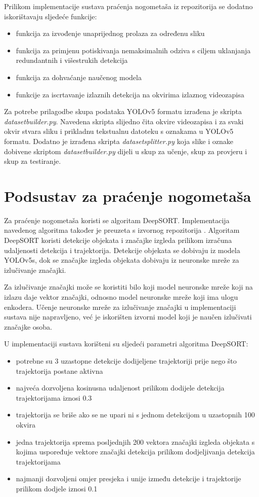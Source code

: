 \documentclass[times, utf8, seminar, numeric]{fer}
\begin{document}
Prilikom implementacije sustava praćenja nogometaša iz repozitorija se dodatno iskorištavaju sljedeće funkcije:
\begin{itemize}
	\item funkcija za izvođenje unaprijednog prolaza za određenu sliku
	\item funkcija za primjenu potiskivanja nemaksimalnih odziva s ciljem uklanjanja redundantnih i višestrukih detekcija
	\item funkcija za dohvaćanje naučenog modela
	\item funkcije za iscrtavanje izlaznih detekcija na okvirima izlaznog videozapisa 
\end{itemize}


Za potrebe prilagodbe skupa podataka YOLOv5 formatu izrađena je skripta \textit{dataset\textunderscore builder.py}. Navedena skripta slijedno čita okvire videozapisa i za svaki okvir stvara sliku i prikladnu tekstualnu datoteku s oznakama u YOLOv5 formatu. 
Dodatno je izrađena skripta \textit{dataset\textunderscore splitter.py} koja slike i oznake dobivene skriptom \textit{dataset\textunderscore builder.py} dijeli u skup za učenje, skup za provjeru i skup za testiranje.

\section{Podsustav za praćenje nogometaša}

Za praćenje nogometaša koristi se algoritam DeepSORT. 
Implementacija navedenog algoritma također je preuzeta s izvornog repozitorija \cite{Wojke2018deep}\cite{deepsort}. 
Algoritam DeepSORT koristi detekcije objekata i značajke izgleda prilikom izračuna udaljenosti detekcija i trajektorija. Detekcije objekata se dobivaju iz modela YOLOv5s, dok se značajke izgleda objekata dobivaju iz neuronske mreže za izlučivanje značajki.

Za izlučivanje značajki može se koristiti bilo koji model neuronske mreže koji na izlazu daje vektor značajki, odnosno model neuronske mreže koji ima ulogu enkodera. Učenje neuronske mreže za izlučivanje značajki u implementaciji sustava nije napravljeno, već je iskorišten izvorni model koji je naučen izlučivati značajke osoba.

U implementaciji sustava korišteni su sljedeći parametri algoritma DeepSORT: 
\begin{itemize}
	\item potrebne su 3 uzastopne detekcije dodijeljene trajektoriji prije nego što trajektorija postane aktivna
	\item najveća dozvoljena kosinusna udaljenost prilikom dodijele detekcija trajektorijama iznosi 0.3
	\item trajektorija se briše ako se ne upari ni s jednom detekcijom u uzastopnih 100 okvira
	\item jedna trajektorija sprema posljednjih 200 vektora značajki izgleda objekata s kojima uspoređuje vektore značajki detekcija prilikom dodjeljivanja detekcija trajektorijama
	\item najmanji dozvoljeni omjer presjeka i unije između detekcije i trajektorije prilikom dodjele iznosi 0.1
\end{itemize}
\end{document}
